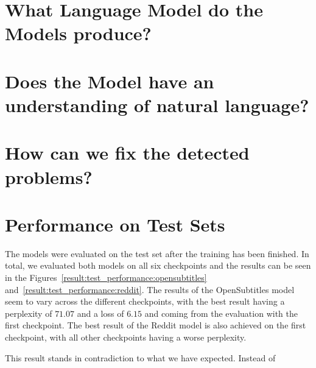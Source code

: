 \section{What Language Model do the Models produce?}
\blindtext

\section{Does the Model have an understanding of natural language?}
\blindtext

\section{How can we fix the detected problems?}
\blindtext

\section{Performance on Test Sets}
The models were evaluated on the test set after the training has been finished. In total, we evaluated both models on all six checkpoints and the results can be seen in the Figures~\ref{result:test_performance:opensubtitles} and~\ref{result:test_performance:reddit}. The results of the OpenSubtitles model seem to vary across the different checkpoints, with the best result having a perplexity of $71.07$ and a loss of $6.15$ and coming from the evaluation with the first checkpoint. The best result of the Reddit model is also achieved on the first checkpoint, with all other checkpoints having a worse perplexity.

This result stands in contradiction to what we have expected. Instead of 

